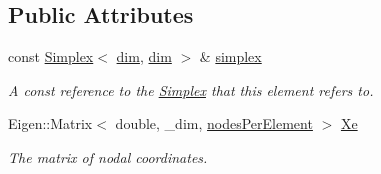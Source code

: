 \subsection*{Public Attributes}
\begin{DoxyCompactItemize}
\item 
const \hyperlink{classmodel_1_1_simplex}{Simplex}$<$ \hyperlink{classmodel_1_1_lagrange_element_a56d161032b73c07c77326cfba73d731d}{dim}, \hyperlink{classmodel_1_1_lagrange_element_a56d161032b73c07c77326cfba73d731d}{dim} $>$ \& \hyperlink{classmodel_1_1_lagrange_element_add9757431ae75842eabec77a4bf0c525}{simplex}
\begin{DoxyCompactList}\small\item\em A const reference to the \hyperlink{classmodel_1_1_simplex}{Simplex} that this element refers to. \end{DoxyCompactList}\item 
Eigen\+::\+Matrix$<$ double, \+\_\+dim, \hyperlink{classmodel_1_1_lagrange_element_a8f86452dcb9f1cc89fdbc0219c397d05}{nodes\+Per\+Element} $>$ \hyperlink{classmodel_1_1_lagrange_element_a498bb72f5edf6e52c95515c8ad1b6f85}{Xe}
\begin{DoxyCompactList}\small\item\em The matrix of nodal coordinates. \end{DoxyCompactList}\end{DoxyCompactItemize}
